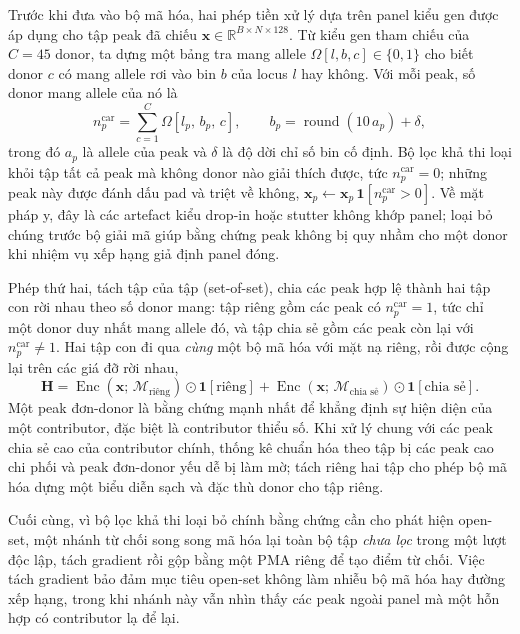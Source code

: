 \documentclass[12pt,a4paper]{article}
\begin{document}
Trước khi đưa vào bộ mã hóa, hai phép tiền xử lý dựa trên panel kiểu gen được áp dụng cho tập peak đã chiếu \(\bm{x}\in\mathbb{R}^{B\times N\times128}\). Từ kiểu gen tham chiếu của \(C=45\) donor, ta dựng một bảng tra mang allele \(\Omega[l,b,c]\in\{0,1\}\) cho biết donor \(c\) có mang allele rơi vào bin \(b\) của locus \(l\) hay không. Với mỗi peak, số donor mang allele của nó là
\begin{equation}
n^{\mathrm{car}}_{p}=\sum_{c=1}^{C}\Omega\!\left[l_p,\,b_p,\,c\right],
\qquad b_p=\operatorname{round}(10\,a_p)+\delta,
\end{equation}
trong đó \(a_p\) là allele của peak và \(\delta\) là độ dời chỉ số bin cố định. Bộ lọc khả thi loại khỏi tập tất cả peak mà không donor nào giải thích được, tức \(n^{\mathrm{car}}_p=0\); những peak này được đánh dấu pad và triệt về không, \(\bm{x}_p\leftarrow\bm{x}_p\,\mathbf{1}[n^{\mathrm{car}}_p>0]\). Về mặt pháp y, đây là các artefact kiểu drop-in hoặc stutter không khớp panel; loại bỏ chúng trước bộ giải mã giúp bằng chứng peak không bị quy nhầm cho một donor khi nhiệm vụ xếp hạng giả định panel đóng.

Phép thứ hai, tách tập của tập (set-of-set), chia các peak hợp lệ thành hai tập con rời nhau theo số donor mang: tập riêng gồm các peak có \(n^{\mathrm{car}}_p=1\), tức chỉ một donor duy nhất mang allele đó, và tập chia sẻ gồm các peak còn lại với \(n^{\mathrm{car}}_p\neq1\). Hai tập con đi qua \emph{cùng} một bộ mã hóa với mặt nạ riêng, rồi được cộng lại trên các giá đỡ rời nhau,
\begin{equation}
\mathbf{H}=\operatorname{Enc}(\bm{x};\,\mathcal{M}_{\text{riêng}})\odot\mathbf{1}[\text{riêng}]
+\operatorname{Enc}(\bm{x};\,\mathcal{M}_{\text{chia sẻ}})\odot\mathbf{1}[\text{chia sẻ}].
\end{equation}
Một peak đơn-donor là bằng chứng mạnh nhất để khẳng định sự hiện diện của một contributor, đặc biệt là contributor thiểu số. Khi xử lý chung với các peak chia sẻ cao của contributor chính, thống kê chuẩn hóa theo tập bị các peak cao chi phối và peak đơn-donor yếu dễ bị làm mờ; tách riêng hai tập cho phép bộ mã hóa dựng một biểu diễn sạch và đặc thù donor cho tập riêng.

Cuối cùng, vì bộ lọc khả thi loại bỏ chính bằng chứng cần cho phát hiện open-set, một nhánh từ chối song song mã hóa lại toàn bộ tập \emph{chưa lọc} trong một lượt độc lập, tách gradient rồi gộp bằng một PMA riêng để tạo điểm từ chối. Việc tách gradient bảo đảm mục tiêu open-set không làm nhiễu bộ mã hóa hay đường xếp hạng, trong khi nhánh này vẫn nhìn thấy các peak ngoài panel mà một hỗn hợp có contributor lạ để lại.
\end{document}
